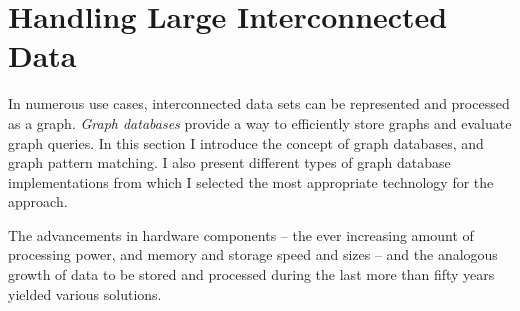 \FloatBarrier

%
%
%
%
%
%


\section{Handling Large Interconnected Data}
In numerous use cases, interconnected data sets can be represented and processed as a graph. \emph{Graph databases} provide a way to efficiently store graphs and evaluate graph queries. In this section I introduce the concept of graph databases, and graph pattern matching. I also present different types of graph database implementations from which I selected the most appropriate technology for the approach.

The advancements in hardware components -- the ever increasing amount of processing power, and memory and storage speed and sizes -- and the analogous growth of data to be stored and processed during the last more than fifty years yielded various solutions.

